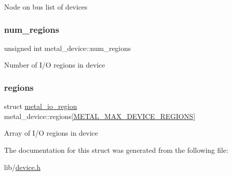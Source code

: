Node on bus\textquotesingle{} list of devices \mbox{\label{structmetal__device_ab224bb579781a75e939373e23e1a7691}} 
\subsubsection{\texorpdfstring{num\+\_\+regions}{num\_regions}}
{\footnotesize\ttfamily unsigned int metal\+\_\+device\+::num\+\_\+regions}

Number of I/O regions in device \mbox{\label{structmetal__device_ad6a86618d3c23da03de5d2b0961a8ba1}} 
\subsubsection{\texorpdfstring{regions}{regions}}
{\footnotesize\ttfamily struct \hyperlink{structmetal__io__region}{metal\+\_\+io\+\_\+region} metal\+\_\+device\+::regions\mbox{[}\hyperlink{system_2zephyr_2sys_8h_ade1e205242a3d9e8ec25535d263aa664}{M\+E\+T\+A\+L\+\_\+\+M\+A\+X\+\_\+\+D\+E\+V\+I\+C\+E\+\_\+\+R\+E\+G\+I\+O\+NS}\mbox{]}}

Array of I/O regions in device 

The documentation for this struct was generated from the following file\+:\begin{DoxyCompactItemize}
\item 
lib/\hyperlink{device_8h}{device.\+h}\end{DoxyCompactItemize}
